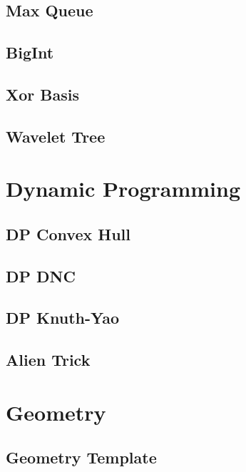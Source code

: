 \subsection{Max Queue}

\subsection{BigInt}

\subsection{Xor Basis}

\subsection{Wavelet Tree}

\section{Dynamic Programming}
\subsection{DP Convex Hull}

\subsection{DP DNC}

\subsection{DP Knuth-Yao}

\subsection{Alien Trick}

\section{Geometry}
\subsection{Geometry Template}

